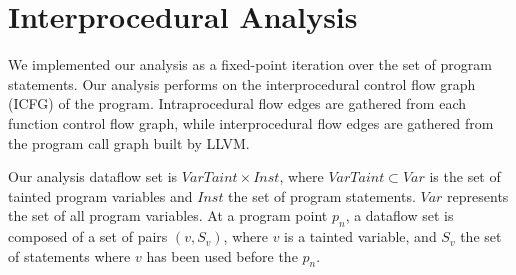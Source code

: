 \section{Interprocedural Analysis}\label{analysis}

We implemented our analysis as a fixed-point iteration
over the set of program statements. Our analysis performs
on the interprocedural control flow graph (ICFG) of the program.
Intraprocedural flow edges are gathered from each function
control flow graph, while interprocedural flow edges are
gathered from the program call graph built by LLVM. 

Our analysis dataflow set is $VarTaint \times Inst$,
where $VarTaint \subset Var$ is the set of tainted program
variables and $Inst$ the set of program statements. 
$Var$ represents the set of all program variables.
At a program point $p_n$, a dataflow set is composed
of a set of pairs $(v, S_v)$, where $v$ is a tainted
variable, and $S_v$ the set of statements where $v$
has been used before the $p_n$.
 

